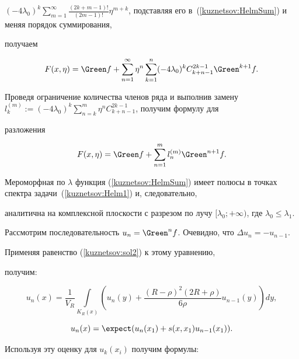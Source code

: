 $(-4\lambda_0)^k\sum_{m=1}^\infty\frac{(2k+m-1)!}{(2m-1)!}\eta^{m+k}$,  подставляя его в~(\ref{kuznetsov:HelmSum}) и меняя порядок суммирования,

получаем

    $$

    F(x,  \eta)=\Green f+\sum_{n=1}^\infty\eta^n\sum_{k=1}^n(-4\lambda_0)^kC_{k+n-1}^{2k-1}\Green^{k+1}f.

    $$

   Проведя ограничение количества членов ряда и выполнив замену $l_k^{(m)}:={(-4\lambda_0)^k\sum_{n=k}^m\eta^nC_{k+n-1}^{2k-1}}$,  получим формулу для

разложения

    $$

        F(x,  \eta)=\Green f+\sum_{n=1}^m l_n^{(m)}\Green^{n+1}f.

    $$



    Мероморфная по $\lambda$ функция (\ref{kuznetsov:HelmSum}) имеет полюсы в точках спектра задачи~(\ref{kuznetsov:Helm1}) и,  следовательно,

аналитична на комплексной плоскости с разрезом по лучу $[\lambda_0; +\infty)$,  где $\lambda_0\leqslant \lambda_1$.



Рассмотрим последовательность $u_n=\Green^n f$. Очевидно,  что ${\Delta u_n=-u_{n-1}}$.

Применяя равенство (\ref{kuznetsov:sol2}) к этому уравнению,

получим:

$$

    u_n(x)=\frac{1}{V_R}\int\limits_{K_{R}(x)}\left(u_n(y)+\frac{(R-\rho)^2(2R+\rho)}{6\rho}u_{n-1}(y)\right)d y, $$

$$

    u_n(x)=\expect(u_n(x_1)+s(x,  x_1)u_{n-1}(x_1)).

$$

Используя эту оценку для $u_k(x_i)$ получим формулы:

